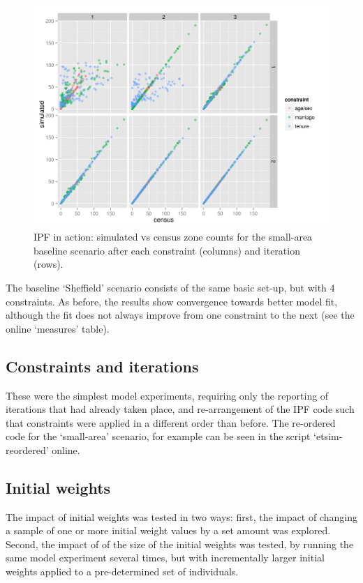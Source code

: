 \documentclass[a4paper,10pt]{article}
\begin{document}
\begin{figure}
 \begin{center}
  \includegraphics[width=12cm]{ipfinac}
 \end{center}
\caption{IPF in action: simulated vs census zone counts for the small-area baseline scenario after each constraint (columns) and iteration (rows).}
\label{fipfinac}
\end{figure}

The baseline `Sheffield' scenario consists of the same basic set-up, 
but with 4 constraints. As before, the results show convergence 
towards better model fit, although the fit does not always improve 
from one constraint to the next (see the online `measures' table). %

\subsection{Constraints and iterations}
These were the simplest model experiments, requiring only
 the reporting of iterations that had already taken place,
 and re-arrangement of the IPF code such that constraints
 were applied in a different order than before. 
The re-ordered code for the `small-area' scenario, 
for example can be seen in the script `etsim-reordered' online.

\subsection{Initial weights}
The impact of initial weights was tested in two ways: first, the impact
 of changing a sample of one or more initial weight values by a set 
amount was explored. Second, the impact of of the size of the initial 
weights was tested, by running the same model experiment several times, 
but with incrementally larger initial weights applied to a pre-determined set of individuals.
\end{document}
